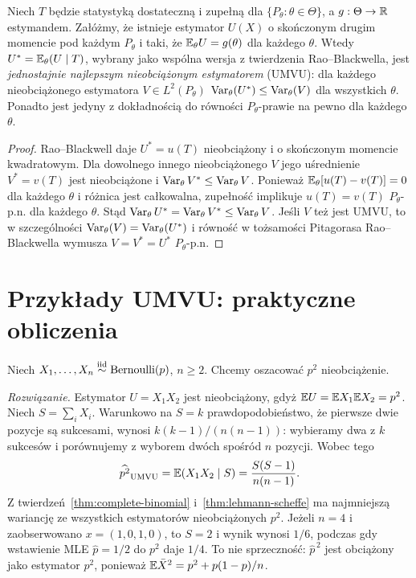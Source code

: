 \begin{twierdzenie}
\label{thm:lehmann-scheffe}
Niech $T$ będzie statystyką dostateczną i zupełną dla
$\{P_\theta:\theta\in\Theta\}$, a $g:\Theta\to\mathbb R$ estymandem.
Załóżmy, że istnieje estymator $U(X)$ o skończonym drugim
momencie pod każdym $P_\theta$ i taki, że
$\mathbb E_\theta U=g(\theta)$ dla każdego $\theta$.
Wtedy $U^*=\mathbb E_\theta(U\mid T)$, wybrany jako wspólna
wersja z twierdzenia Rao--Blackwella, jest \emph{jednostajnie
najlepszym nieobciążonym estymatorem} (UMVU): dla każdego
nieobciążonego estymatora $V\in L^2(P_\theta)$
$\operatorname{Var}_\theta(U^*)\le\operatorname{Var}_\theta(V)$ dla wszystkich $\theta$.
Ponadto jest jedyny z dokładnością do równości
$P_\theta$-prawie na pewno dla każdego $\theta$.
\end{twierdzenie}
\begin{proof}
Rao--Blackwell daje $U^*=u(T)$ nieobciążony i o skończonym
momencie kwadratowym. Dla dowolnego innego nieobciążonego
$V$ jego uśrednienie $V^*=v(T)$ jest nieobciążone i
$\operatorname{Var}_\theta V^*\le\operatorname{Var}_\theta V$. Ponieważ
$\mathbb E_\theta[u(T)-v(T)]=0$ dla każdego $\theta$ i różnica
jest całkowalna, zupełność implikuje
$u(T)=v(T)$ $P_\theta$-p.n. dla każdego $\theta$.
Stąd $\operatorname{Var}_\theta U^*=\operatorname{Var}_\theta V^*\le\operatorname{Var}_\theta V$.
Jeśli $V$ też jest UMVU, to w szczególności
$\operatorname{Var}_\theta(V)=\operatorname{Var}_\theta(U^*)$ i równość w tożsamości
Pitagorasa Rao--Blackwella wymusza
$V=V^*=U^*$ $P_\theta$-p.n.
\end{proof}

\section{Przykłady UMVU: praktyczne obliczenia}
\begin{zadanie}
\label{zad:umvu-p2}
Niech $X_1,\ldots,X_n\mathrel{\overset{\mathrm{iid}}\sim}\operatorname{Bernoulli}(p)$,
$n\ge2$. Chcemy oszacować $p^2$ nieobciążenie.
\par\emph{Rozwiązanie.} Estymator $U=X_1X_2$ jest nieobciążony,
gdyż $\mathbb E U=\mathbb E X_1\mathbb E X_2=p^2$.
Niech $S=\sum_iX_i$. Warunkowo na $S=k$ prawdopodobieństwo,
że pierwsze dwie pozycje są sukcesami, wynosi
$k(k-1)/(n(n-1))$: wybieramy dwa z $k$ sukcesów i
porównujemy z wyborem dwóch spośród $n$ pozycji. Wobec tego
\[
\widehat{p^2}_{\rm UMVU}=\mathbb E(X_1X_2\mid S)
=\frac{S(S-1)}{n(n-1)}.
\]
Z twierdzeń~\ref{thm:complete-binomial} i~\ref{thm:lehmann-scheffe}
ma najmniejszą wariancję ze wszystkich estymatorów
nieobciążonych $p^2$. Jeżeli $n=4$ i zaobserwowano
$x=(1,0,1,0)$, to $S=2$ i wynik wynosi $1/6$, podczas gdy
wstawienie MLE $\widehat p=1/2$ do $p^2$ daje $1/4$.
To nie sprzeczność: $\widehat p^{\,2}$ jest obciążony jako
estymator $p^2$, ponieważ
$\mathbb E\bar X^2=p^2+p(1-p)/n$.
\end{zadanie}

